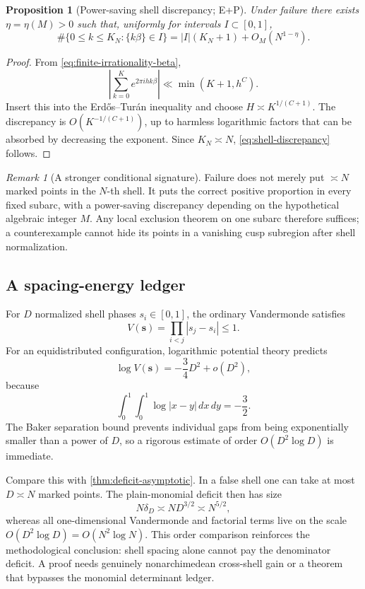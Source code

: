 \documentclass[10pt,oneside]{article}
\newtheorem{proposition}[theorem]{Proposition}
\theoremstyle{definition}
\theoremstyle{remark}
\newtheorem{remark}[theorem]{Remark}
\newcommand{\statusP}{\textsc{P}}
\newcommand{\statusE}{\textsc{E}}
\begin{document}
\begin{proposition}[Power-saving shell discrepancy; \statusE+\statusP]
\label{prop:shell-discrepancy}
Under failure there exists \(\eta=\eta(M)>0\) such that, uniformly for intervals \(I\subset[0,1]\),
\begin{equation}
 \#\{0\le k\le K_N:\{k\beta\}\in I\}
 =|I|(K_N+1)+O_M(N^{1-\eta}).
\label{eq:shell-discrepancy}
\end{equation}
\end{proposition}

\begin{proof}
From \eqref{eq:finite-irrationality-beta},
\[
 \left|\sum_{k=0}^{K}e^{2\pi i h k\beta}\right|
 \ll\min(K+1,h^C).
\]
Insert this into the Erd\H{o}s--Tur\'an inequality \cite{KuipersNiederreiter} and choose
\(H\asymp K^{1/(C+1)}\).  The discrepancy is
\(O(K^{-1/(C+1)})\), up to harmless logarithmic factors that can be absorbed by decreasing the exponent.  Since \(K_N\asymp N\), \eqref{eq:shell-discrepancy} follows.
\end{proof}

\begin{remark}[A stronger conditional signature]
Failure does not merely put \(\asymp N\) marked points in the \(N\)-th shell.  It puts the correct positive proportion in every fixed subarc, with a power-saving discrepancy depending on the hypothetical algebraic integer \(M\).  Any local exclusion theorem on one subarc therefore suffices; a counterexample cannot hide its points in a vanishing cusp subregion after shell normalization.
\end{remark}

\subsection{A spacing-energy ledger}
For \(D\) normalized shell phases \(s_i\in[0,1]\), the ordinary Vandermonde satisfies
\[
 V(\bm s)=\prod_{i<j}|s_j-s_i|\le1.
\]
For an equidistributed configuration, logarithmic potential theory predicts
\[
 \log V(\bm s)=-\frac34D^2+o(D^2),
\]
because
\[
 \int_0^1\!\int_0^1\log|x-y|\,dx\,dy=-\frac32.
\]
The Baker separation bound prevents individual gaps from being exponentially smaller than a power of \(D\), so a rigorous estimate of order \(O(D^2\log D)\) is immediate.

Compare this with \cref{thm:deficit-asymptotic}.  In a false shell one can take at most \(D\asymp N\) marked points.  The plain-monomial deficit then has size
\[
 N\delta_D\asymp N D^{3/2}\asymp N^{5/2},
\]
whereas all one-dimensional Vandermonde and factorial terms live on the scale \(O(D^2\log D)=O(N^2\log N)\).  This order comparison reinforces the methodological conclusion: shell spacing alone cannot pay the denominator deficit.  A proof needs genuinely nonarchimedean cross-shell gain or a theorem that bypasses the monomial determinant ledger.
\end{document}
